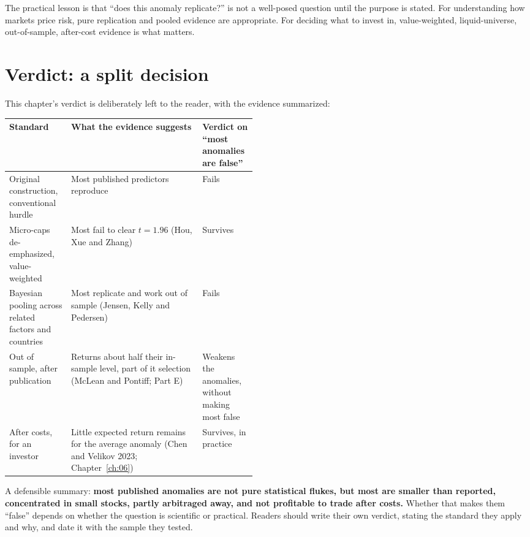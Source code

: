 The practical lesson is that ``does this anomaly replicate?'' is not a well-posed question until the purpose is stated. For understanding how markets price risk, pure replication and pooled evidence are appropriate. For deciding what to invest in, value-weighted, liquid-universe, out-of-sample, after-cost evidence is what matters.

\section{Verdict: a split decision}
\label{sec:10-verdict}

This chapter's verdict is deliberately left to the reader, with the evidence summarized:

\begin{center}
\small
\begin{tabularx}{0.9\linewidth}{@{}>{\raggedright\arraybackslash}p{0.25\linewidth}>{\raggedright\arraybackslash}X>{\raggedright\arraybackslash}p{0.22\linewidth}@{}}
\toprule
Standard & What the evidence suggests & Verdict on ``most anomalies are false'' \\
\midrule
Original construction, conventional hurdle & Most published predictors reproduce & Fails \\
Micro-caps de-emphasized, value-weighted & Most fail to clear $t = 1.96$ (Hou, Xue and Zhang) & Survives \\
Bayesian pooling across related factors and countries & Most replicate and work out of sample (Jensen, Kelly and Pedersen) & Fails \\
Out of sample, after publication & Returns about half their in-sample level, part of it selection (McLean and Pontiff; Part E) & Weakens the anomalies, without making most false \\
After costs, for an investor & Little expected return remains for the average anomaly (Chen and Velikov 2023; Chapter~\ref{ch:06}) & Survives, in practice \\
\bottomrule
\end{tabularx}
\end{center}

A defensible summary: \textbf{most published anomalies are not pure statistical flukes, but most are smaller than reported, concentrated in small stocks, partly arbitraged away, and not profitable to trade after costs.} Whether that makes them ``false'' depends on whether the question is scientific or practical. Readers should write their own verdict, stating the standard they apply and why, and date it with the sample they tested.

